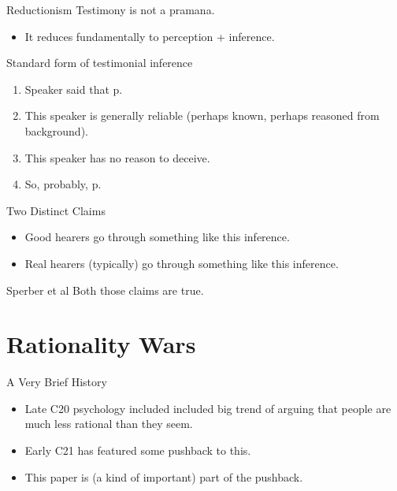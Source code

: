 \documentclass[
  17pt,
  letterpaper,
  ignorenonframetext,
  aspectratio=169,
]{beamer}
\providecommand{\tightlist}{%
  \setlength{\itemsep}{0pt}\setlength{\parskip}{0pt}}\usepackage{longtable,booktabs,array}
\begin{document}
\begin{frame}{Reductionism}
\protect\hypertarget{reductionism-1}{}
Testimony is not a pramana.

\begin{itemize}[<+->]
\tightlist
\item
  It reduces fundamentally to perception + inference.
\end{itemize}
\end{frame}

\begin{frame}{Standard form of testimonial inference}
\protect\hypertarget{standard-form-of-testimonial-inference}{}
\begin{enumerate}[<+->]
\tightlist
\item
  Speaker said that p.
\item
  This speaker is generally reliable (perhaps known, perhaps reasoned
  from background).
\item
  This speaker has no reason to deceive.
\item
  So, probably, p.
\end{enumerate}
\end{frame}

\begin{frame}{Two Distinct Claims}
\protect\hypertarget{two-distinct-claims}{}
\begin{itemize}[<+->]
\tightlist
\item
  Good hearers go through something like this inference.
\item
  Real hearers (typically) go through something like this inference.
\end{itemize}
\end{frame}

\begin{frame}{Sperber et al}
\protect\hypertarget{sperber-et-al}{}
Both those claims are true.
\end{frame}

\hypertarget{rationality-wars}{%
\section{Rationality Wars}\label{rationality-wars}}

\begin{frame}{A Very Brief History}
\protect\hypertarget{a-very-brief-history}{}
\begin{itemize}[<+->]
\tightlist
\item
  Late C20 psychology included included big trend of arguing that people
  are much less rational than they seem.
\item
  Early C21 has featured some pushback to this.
\item
  This paper is (a kind of important) part of the pushback.
\end{itemize}
\end{frame}
\end{document}
